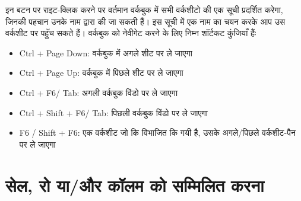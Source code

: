 इन बटन पर राइट-क्लिक करने पर वर्तमान वर्कबुक में सभी वर्कशीटो की एक सूची प्रदर्शित करेगा, जिनकी पहचान उनके नाम द्वारा की जा सकती हैं। इस सूची में एक नाम का चयन करके आप उस वर्कशीट पर पहॅुच सकते हैं। वर्कबुक को नेवीगेट करने के लिए निम्न शॉर्टकट कुंजियाँ हैंः
\begin{itemize}[topsep=-1ex,parsep=0ex,partopsep=0ex,itemsep=0.5ex]
\item  {\eng Ctrl + Page Down:}  वर्कबुक में अगले शीट पर ले जाएगा
\item  {\eng Ctrl + Page Up:}  वर्कबुक में पिछले शीट पर ले जाएगा
\item  {\eng Ctrl + F6/ Tab:}  अगली वर्कबुक विंडो पर ले जाएगा
\item  {\eng Ctrl + Shift + F6/ Tab:}  पिछली वर्कबुक विंडो पर ले जाएगा
\item  {\eng F6 / Shift + F6:}  एक वर्कशीट जो कि विभाजित कि गयी है, उसके अगले/पिछले वर्कशीट-पैन पर ले जाएगा			
\end{itemize}
				
\section{सेल, रो या/और कॉलम को सम्मिलित करना}\label{id-1.15}
\def\paragraphTitle#1{\medbreak\noindent{\bfseries \color{red}{#1}}}
\paragraphTitle{किसी वर्कशीट में रिक्त सेल को सम्मिलित करना}

